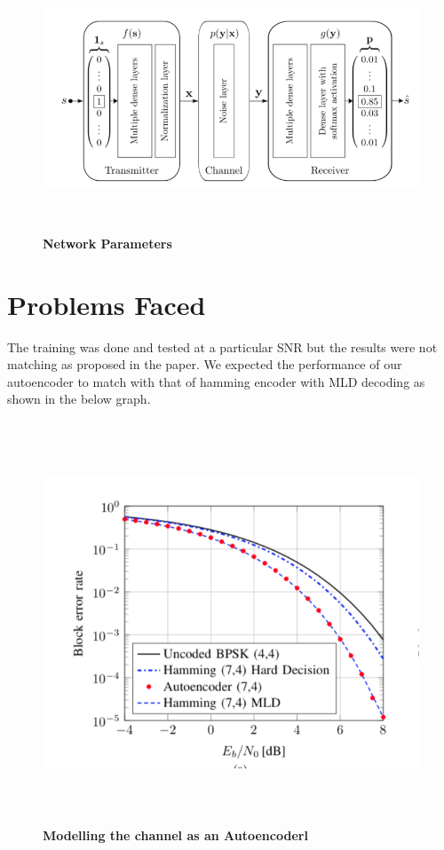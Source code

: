 \begin{figure}[H]
  \centering
    \includegraphics[height= 8cm, width=18cm]{project/images/statisticsOfNetwork.png}
  \caption{\textbf{Network Parameters}}
\end{figure}

\newpage
\section{Problems Faced}
The training was done and tested at a particular SNR but the results were not matching as proposed in the paper. We expected the performance of our autoencoder to match with that of hamming encoder with MLD decoding as shown in the below graph. 

\begin{figure}[H]
  \centering
    \includegraphics[height= 12cm, width=14cm]{project/images/graph.png}
  \caption{\textbf{Modelling the channel as an Autoencoderl}}
\end{figure}